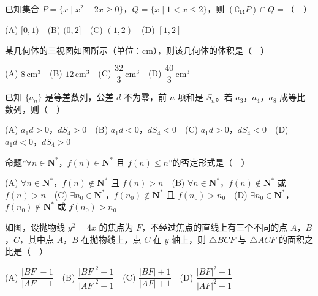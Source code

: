 \begin{question}
已知集合 \(P=\{x\mid x^2-2x\geqslant0\}\)，\(Q=\{x\mid 1<x\leqslant2\}\)，则 \((\complement_{\mathbf{R}}P)\cap Q=\)（　）

(A) \([0,1)\)　(B) \((0,2]\)　(C) \((1,2)\)　(D) \([1,2]\)

\Needspace{0.4\textheight}
\end{question}
\begin{question}
某几何体的三视图如图所示（单位：\(\mathrm{cm}\)），则该几何体的体积是（　）
\nopagebreak[4]
\begin{center}\end{center}
\nopagebreak[4]
(A) \(8\,\mathrm{cm}^3\)　(B) \(12\,\mathrm{cm}^3\)　(C) \(\dfrac{32}{3}\,\mathrm{cm}^3\)　(D) \(\dfrac{40}{3}\,\mathrm{cm}^3\)

\end{question}
\begin{question}
已知 \(\{a_n\}\) 是等差数列，公差 \(d\) 不为零，前 \(n\) 项和是 \(S_n\)。若 \(a_3\)，\(a_4\)，\(a_8\) 成等比数列，则（　）

(A) \(a_1d>0\)，\(dS_4>0\)　(B) \(a_1d<0\)，\(dS_4<0\)　(C) \(a_1d>0\)，\(dS_4<0\)　(D) \(a_1d<0\)，\(dS_4>0\)

\end{question}
\begin{question}
命题“\(\forall n\in\mathbf{N}^*\)，\(f(n)\in\mathbf{N}^*\) 且 \(f(n)\leqslant n\)”的否定形式是（　）

(A) \(\forall n\in\mathbf{N}^*\)，\(f(n)\notin\mathbf{N}^*\) 且 \(f(n)>n\)　(B) \(\forall n\in\mathbf{N}^*\)，\(f(n)\notin\mathbf{N}^*\) 或 \(f(n)>n\)　(C) \(\exists n_0\in\mathbf{N}^*\)，\(f(n_0)\notin\mathbf{N}^*\) 且 \(f(n_0)>n_0\)　(D) \(\exists n_0\in\mathbf{N}^*\)，\(f(n_0)\notin\mathbf{N}^*\) 或 \(f(n_0)>n_0\)

\Needspace{0.4\textheight}
\end{question}
\begin{question}
如图，设抛物线 \(y^2=4x\) 的焦点为 \(F\)，不经过焦点的直线上有三个不同的点 \(A\)，\(B\)，\(C\)，其中点 \(A\)，\(B\) 在抛物线上，点 \(C\) 在 \(y\) 轴上，则 \(\triangle BCF\) 与 \(\triangle ACF\) 的面积之比是（　）
\nopagebreak[4]
\begin{center}\end{center}
\nopagebreak[4]
(A) \(\dfrac{|BF|-1}{|AF|-1}\)　(B) \(\dfrac{|BF|^2-1}{|AF|^2-1}\)　(C) \(\dfrac{|BF|+1}{|AF|+1}\)　(D) \(\dfrac{|BF|^2+1}{|AF|^2+1}\)

\end{question}
